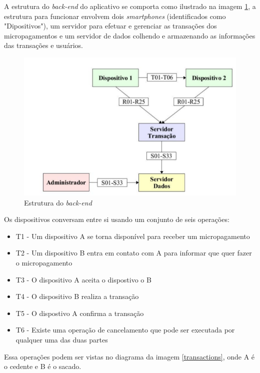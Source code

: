 \documentclass[hidelinks,12pt]{article}
\begin{document}
A estrutura do \textit{back-end} do aplicativo se comporta como ilustrado na imagem \ref{estrut}, a estrutura para funcionar envolvem dois \textit{smartphones} (identificados como "Dipositivos"), um servidor para efetuar e gerenciar as transa\c{c}\~oes dos micropagamentos e um servidor de dados colhendo e armazenando as informa\c{c}\~oes das transa\c{c}\~oes e usu\'arios.
\begin{figure}[H]
	\centering
	\includegraphics[scale=0.5]{estrutura} 
	\caption{Estrutura do \textit{back-end}}
	\label{estrut}
\end{figure}
Os dispositivos conversam entre si usando um conjunto de seis opera\c{c}\~oes:
\begin{itemize}
	\item T1 - Um dispositivo A se torna dispon\'ivel para receber um micropagamento
	\item T2 - Um dispositivo B entra em contato com A para informar que quer fazer o micropagamento
	\item T3 - O dispositivo A aceita o dispostivo o B
	\item T4 - O dispositivo B realiza a transa\c{c}\~ao
	\item T5 - O dispostivo A confirma a transa\c{c}\~ao
	\item T6 - Existe uma opera\c{c}\~ao de cancelamento que pode ser executada por qualquer uma das duas partes
\end{itemize}
Essa opera\c{c}\~oes podem ser vistas no diagrama da imagem \ref{transactions}, onde A \'e o cedente e B \'e o sacado.
\end{document}
